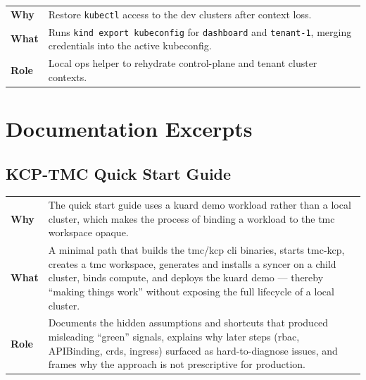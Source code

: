 \documentclass[11pt, a4paper, oneside, listof=totoc]{scrartcl}
\makeatletter
\newcommand{\codesummary}[3]{%
    \vspace{0.4\baselineskip}%
    \noindent\begin{tabularx}{\linewidth}{@{}>{\bfseries}l X@{}}
    Why  & #1\\
    What & #2\\
    Role & #3\\
    \end{tabularx}%
    \vspace{0.2\baselineskip}%
}
\makeatother
\begin{document}
                \codesummary
                    {Restore \texttt{kubectl} access to the dev clusters after context loss.}
                    {Runs \texttt{\gls{kind} export kubeconfig} for \texttt{dashboard} and \texttt{tenant-1}, merging credentials into the active kubeconfig.}
                    {Local ops helper to rehydrate control-plane and tenant cluster contexts.}

        \clearpage

        \section{Documentation Excerpts}\label{app:docs}
            \subsection{KCP-TMC Quick Start Guide}
                \codesummary
                    {The quick start guide uses a \gls{kuard} demo workload rather than a local cluster, which makes the process of binding a workload to the \gls{tmc} workspace opaque.}
                    {A minimal path that builds the \gls{tmc}/\gls{kcp} \gls{cli} binaries, starts \gls{tmc}-\gls{kcp}, creates a \gls{tmc} workspace, generates and installs a syncer on a child cluster, binds compute, and deploys the \gls{kuard} demo --- thereby \enquote{making things work} without exposing the full lifecycle of a local cluster.}
                    {Documents the hidden assumptions and shortcuts that produced misleading \enquote{green} signals, explains why later steps (\gls{rbac}, APIBinding, \glspl{crd}, ingress) surfaced as hard-to-diagnose issues, and frames why the approach is not prescriptive for production.}
\end{document}
